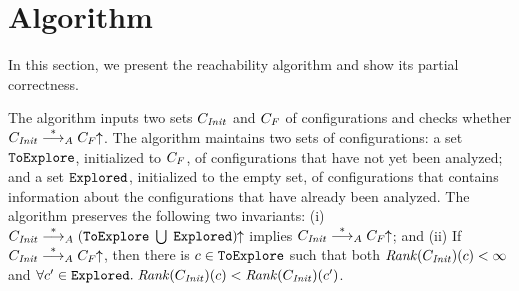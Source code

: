 \section{Algorithm}
\label{section:algorithm}
%

In this section, we present the reachability algorithm
and show its partial correctness.
%

The algorithm inputs two sets $C_{\it Init}$ and $C_F$ of configurations
and  checks whether $C_{\it Init}\stackrel{*}{\longrightarrow}_AC_F\!\!\uparrow$.
%
The algorithm maintains two sets of configurations: a set
${\tt ToExplore}$, initialized to $C_F$, of configurations that
have not yet been analyzed; and a set ${\tt Explored}$, initialized to the
empty set, of configurations that contains information about the 
configurations that have already been analyzed.
%
The algorithm preserves the following two invariants:
(i)
  $C_{\it Init}\stackrel{*}{\longrightarrow}_A\left({\tt ToExplore}\;\bigcup\;{\tt Explored}\right)\!\!\uparrow$
  implies $C_{\it Init}\stackrel{*}{\longrightarrow}_AC_F\!\!\uparrow$; and
(ii)
  If $C_{\it Init} \stackrel{*}{\longrightarrow}_AC_F\!\!\uparrow$, then there is
  $c\in{\tt ToExplore}$ such that both
  ${\it Rank}(C_{\it Init})(c)<\infty$ and $\forall c'\in{\tt Explored}.\;
  {\it Rank}(C_{\it Init})(c)<{\it Rank}(C_{\it Init})(c')$.
%


